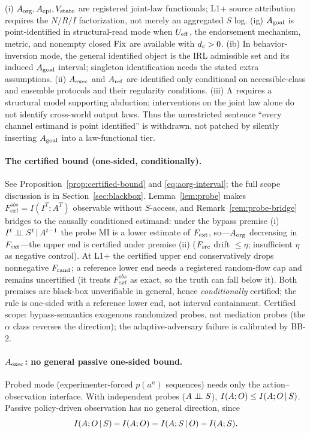 \begin{proposition}
\textup{(i)} $A_{\mathrm{org}},A_{\mathrm{epi}},V_{\mathrm{state}}$ are registered joint-law functionals; L1+
source attribution requires the $N/R/I$ factorization, not merely an
aggregated $S$ log. \textup{(ig)} $A_{\mathrm{goal}}$ is point-identified in
structural-read mode when $U_{\mathrm{eff}}$, the endorsement mechanism, metric, and
nonempty closed $\mathrm{Fix}$ are available with $d_{c}>0$. \textup{(ib)} In
behavior-inversion mode, the general identified object is the IRL admissible
set and its induced $A_{\mathrm{goal}}$ interval; singleton identification needs the
stated extra assumptions. \textup{(ii)} $A_{\mathrm{exec}}$ and $A_{\mathrm{ref}}$ are identified
only conditional on accessible-class and ensemble protocols and their
regularity conditions. \textup{(iii)} $\Lambda$ requires a structural model
supporting abduction; interventions on the joint law alone do not identify
cross-world output laws. Thus the unrestricted sentence ``every channel estimand is
point identified'' is withdrawn, not patched by silently inserting $A_{\mathrm{goal}}$
into a law-functional tier.
\end{proposition}

\paragraph{The certified bound (one-sided, conditionally).} See
Proposition~\ref{prop:certified-bound} and \eqref{eq:aorg-interval}; the full
scope discussion is in Section~\ref{sec:blackbox}. Lemma~\ref{lem:probe} makes
$F_{ext}^{obs}=I(I^T;A^T)$ observable without $S$-access, and
Remark~\ref{rem:probe-bridge} bridges to the causally conditioned estimand:
under the bypass premise (i) $I^t\perp\!\!\!\perp S^t\,|\, A^{t-1}$ the probe MI is a lower
estimate of $F_{\mathrm{ext}}$, so---$A_{\mathrm{org}}$ decreasing in $F_{\mathrm{ext}}$---the upper end is
certified under premise (ii) ($F_{\mathrm{src}}$ drift $\le\eta$; insufficient $\eta$ as
negative control). At L1+ the certified upper end conservatively drops
nonnegative $F_{\mathrm{rand}}$; a reference lower end needs a registered random-flow cap
and remains uncertified (it treats $F_{ext}^{obs}$ as exact, so the truth can
fall below it). Both premises are black-box unverifiable in general, hence
\emph{conditionally} certified; the rule is one-sided with a reference lower
end, not interval containment. Certified scope: bypass-semantics exogenous
randomized probes, not mediation probes (the $\alpha$ class reverses the
direction); the adaptive-adversary failure is calibrated by BB-2.

\paragraph{$A_{\mathrm{exec}}$: no general passive one-sided bound.}
Probed mode (experimenter-forced $p(a^n)$ sequences) needs only the
action--observation interface. With independent probes ($A\perp\!\!\!\perp S$),
$I(A;O)\le I(A;O\,|\, S)$. Passive policy-driven observation has no general
direction, since
\[
I(A;O\,|\, S)-I(A;O)=I(A;S\,|\, O)-I(A;S).
\]

